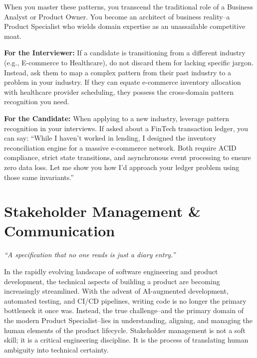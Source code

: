 \documentclass[
  11pt,
  openany,
  oneside]{book}
\renewenvironment{quote}{\begin{customquote}}{\end{customquote}}
\begin{document}
When you master these patterns, you transcend the traditional role of a
Business Analyst or Product Owner. You become an architect of business
reality--a Product Specialist who wields domain expertise as an
unassailable competitive moat.

\begin{quote}
\textbf{For the Interviewer:} If a candidate is transitioning from a
different industry (e.g., E-commerce to Healthcare), do not discard them
for lacking specific jargon. Instead, ask them to map a complex pattern
from their past industry to a problem in your industry. If they can
equate e-commerce inventory allocation with healthcare provider
scheduling, they possess the cross-domain pattern recognition you need.
\end{quote}

\begin{quote}
\textbf{For the Candidate:} When applying to a new industry, leverage
pattern recognition in your interviews. If asked about a FinTech
transaction ledger, you can say: ``While I haven't worked in lending, I
designed the inventory reconciliation engine for a massive e-commerce
network. Both require ACID compliance, strict state transitions, and
asynchronous event processing to ensure zero data loss. Let me show you
how I'd approach your ledger problem using those same invariants.''
\end{quote}

\chapter{Stakeholder Management \&
Communication}\label{stakeholder-management-communication}

\begin{quote}
\emph{``A specification that no one reads is just a diary entry.''}
\end{quote}

In the rapidly evolving landscape of software engineering and product
development, the technical aspects of building a product are becoming
increasingly streamlined. With the advent of AI-augmented development,
automated testing, and CI/CD pipelines, writing code is no longer the
primary bottleneck it once was. Instead, the true challenge--and the
primary domain of the modern Product Specialist--lies in understanding,
aligning, and managing the human elements of the product lifecycle.
Stakeholder management is not a soft skill; it is a critical engineering
discipline. It is the process of translating human ambiguity into
technical certainty.
\end{document}
